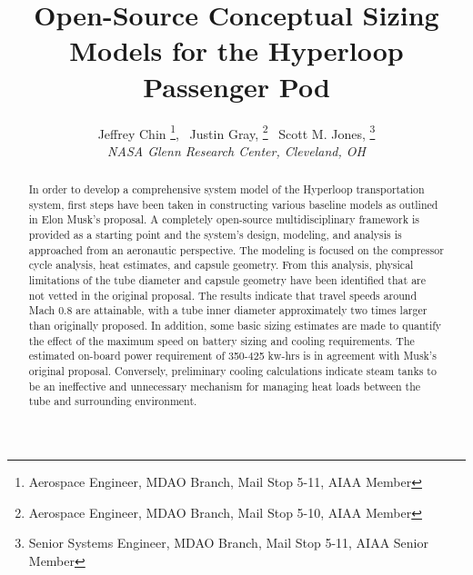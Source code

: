 \documentclass[]             %
{aiaa-tc}                       %
\title{Open-Source Conceptual Sizing Models for the Hyperloop Passenger Pod}
\author{
  Jeffrey Chin%
     \thanks{Aerospace Engineer, MDAO Branch, Mail Stop 5-11, AIAA Member},
  \ Justin Gray,%
     \thanks{Aerospace Engineer, MDAO Branch, Mail Stop 5-10, AIAA Member}
  \ Scott M. Jones,%
     \thanks{Senior Systems Engineer, MDAO Branch, Mail Stop 5-11, AIAA Senior Member}
   \\
  {\normalsize\itshape
  NASA Glenn Research Center, Cleveland, OH}
}
\begin{document}
\maketitle

\begin{abstract}

In order to develop a comprehensive system model of the Hyperloop transportation system, first steps have been taken in constructing
various baseline models as outlined in Elon Musk's proposal. A completely open-source multidisciplinary framework is provided as a starting point
and the system's design, modeling, and analysis is approached from an aeronautic perspective. The modeling is
focused on the compressor cycle analysis, heat estimates, and capsule geometry. From this analysis, physical limitations of the tube diameter and
capsule geometry have been identified that are not vetted in the original proposal. The results indicate that travel speeds around Mach 0.8 are
attainable, with a tube inner diameter approximately two times larger than originally proposed. In addition, some basic sizing estimates are made to
quantify the effect of the maximum speed on battery sizing and cooling requirements. The estimated on-board power
requirement of 350-425 kw-hrs is in agreement with Musk's original proposal. Conversely, preliminary cooling calculations indicate
 steam tanks to be an ineffective and unnecessary mechanism for managing heat loads between the tube and surrounding environment.
 \end{abstract}  

\setcounter{secnumdepth}{1}
\setcounter{tocdepth}{1}
\printnomenclature
 





\end{document}
